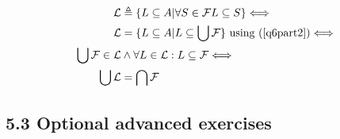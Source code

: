 \documentclass[10pt,\jkfside,a4paper]{article}
\begin{document}
\begin{enumerate}
\begin{enumerate}
\begin{equation}
\begin{split}
\mathcal{L} &\triangleq \{ L \subseteq A | \forall S \in \mathcal{F} L \subseteq S \} \Longleftrightarrow\\
\mathcal{L} &= \{ L \subseteq A | L \subseteq \bigcup \mathcal{F} \} \text{ using (\ref{q6part2})} \Longleftrightarrow\\
\bigcup \mathcal{F} \in \mathcal{L} &\wedge \forall L \in \mathcal{L}: L \subseteq \mathcal{F} \Longleftrightarrow\\
\bigcup \mathcal{L} &= \bigcap \mathcal{F}\\
\end{split}
\end{equation}

\end{enumerate}

\end{enumerate}

\subsection*{5.3 Optional advanced exercises}
\end{document}

